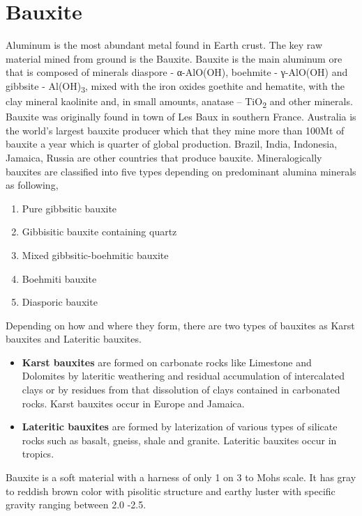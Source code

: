 \documentclass[12pt,a4paper, top=1.9cm, bottom=2.03cm, left=3.81cm, right=1.9cm]{article}
\begin{document}
\section{Bauxite}
\noindent\fontsize{12}{14}\selectfont Aluminum is the most abundant metal found in Earth crust. The key raw material mined from ground is the Bauxite. Bauxite is the main aluminum ore that is composed of minerals diaspore - α-AlO(OH), boehmite - γ-AlO(OH) and gibbsite - Al(OH)\textsubscript{3}, mixed with the iron oxides goethite and hematite, with the clay mineral kaolinite and, in small amounts, anatase – TiO\textsubscript{2} and other minerals. Bauxite was originally found in town of Les Baux in southern France. Australia is the world’s largest bauxite producer which that they mine more than 100Mt of bauxite a year which is quarter of global production. Brazil, India, Indonesia, Jamaica, Russia are other countries that produce bauxite. Mineralogically bauxites are classified into five types depending on predominant alumina minerals as following,
\begin{enumerate}[label=\arabic*.]  %
    \item Pure gibbsitic bauxite
    \item Gibbisitic bauxite containing quartz
    \item Mixed gibbsitic-boehmitic bauxite 
    \item Boehmiti bauxite 
    \item Diasporic bauxite
\end{enumerate}
\noindent\fontsize{12}{14}\selectfont Depending on how and where they form, there are two types of bauxites as Karst bauxites and Lateritic bauxites.
\begin{itemize}[label=\textbullet]  %
\item \textbf{Karst bauxites} are formed on carbonate rocks like Limestone and Dolomites by lateritic weathering and residual accumulation of intercalated clays or by residues from that dissolution of clays contained in carbonated rocks. Karst bauxites occur in Europe and Jamaica. 
\item \textbf{Lateritic bauxites} are formed by laterization of various types of silicate rocks such as basalt, gneiss, shale and granite. Lateritic bauxites occur in tropics.
\end{itemize}
\noindent\fontsize{12}{14}\selectfont Bauxite is a soft material with a harness of only 1 on 3 to Mohs scale. It has gray to reddish brown color with pisolitic structure and earthy luster with specific gravity ranging between 2.0 -2.5.
\end{document}
